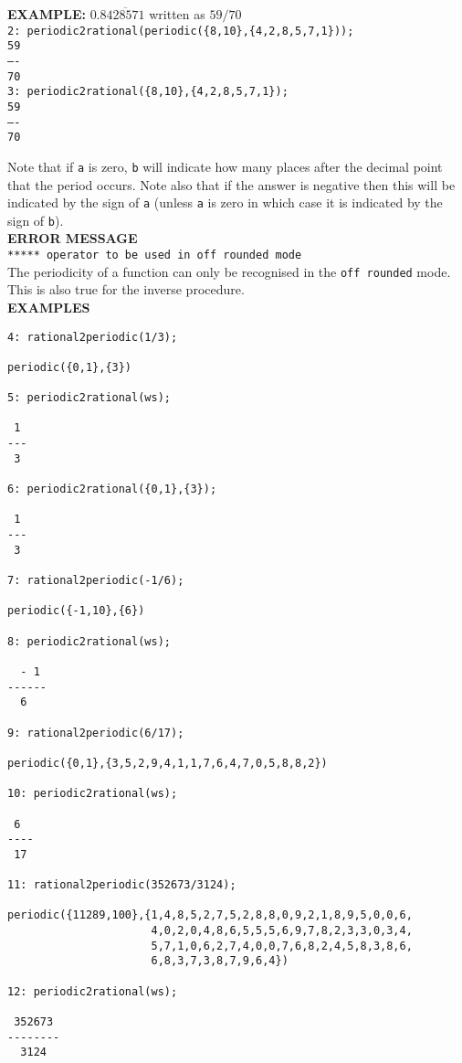 \begin{tabbing}
\textbf{EXAMPLE:}
    \> $0.8\overline{428571}$ written as $59/70$ \\
    \> \texttt{2: periodic2rational(periodic(\{8,10\},\{4,2,8,5,7,1\}));}
\\[\baselineskip]
    \> \hspace{1mm} \texttt{59}\\
    \> \texttt{----}\\
    \> \hspace{1mm} \texttt{70}\\[\baselineskip]
    \> \texttt{3: periodic2rational(\{8,10\},\{4,2,8,5,7,1\});}
\\[\baselineskip]
    \> \hspace{1mm} \texttt{59}\\
    \> \texttt{----}\\
    \> \hspace{1mm} \texttt{70}
\end{tabbing}

Note that if \texttt{a} is zero, \texttt{b} will indicate how many places
after the decimal point that the period occurs. Note also that if the answer
is negative then this will be indicated by the sign of \texttt{a} (unless
\texttt{a} is zero in which case it is indicated by the sign of \texttt{b}).
\\[\baselineskip]
%
%
\textbf{ERROR MESSAGE}\\
%
\texttt{***** operator to be used in off rounded mode}\\
%
The periodicity of a function can only be recognised in
the \texttt{off rounded} mode. This is also true for the inverse
procedure.\\[\baselineskip]
%
%
{\large\bf EXAMPLES}\\
\begin{verbatim}
4: rational2periodic(1/3);

periodic({0,1},{3})

5: periodic2rational(ws);

 1
---
 3

6: periodic2rational({0,1},{3});

 1
---
 3

7: rational2periodic(-1/6);

periodic({-1,10},{6})

8: periodic2rational(ws);

  - 1
------
  6

9: rational2periodic(6/17);

periodic({0,1},{3,5,2,9,4,1,1,7,6,4,7,0,5,8,8,2})

10: periodic2rational(ws);

 6
----
 17

11: rational2periodic(352673/3124);

periodic({11289,100},{1,4,8,5,2,7,5,2,8,8,0,9,2,1,8,9,5,0,0,6,
                      4,0,2,0,4,8,6,5,5,5,6,9,7,8,2,3,3,0,3,4,
                      5,7,1,0,6,2,7,4,0,0,7,6,8,2,4,5,8,3,8,6,
                      6,8,3,7,3,8,7,9,6,4})

12: periodic2rational(ws);

 352673
--------
  3124

\end{verbatim}
